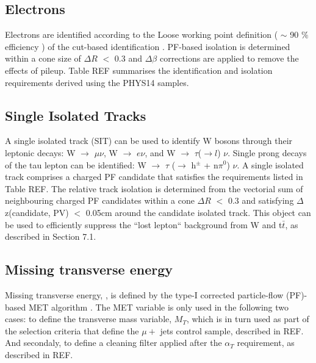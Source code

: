 \subsection{Electrons}
\label{sec:electron-id}
Electrons are identified according to the Loose working point definition ( $\sim$ 90 $\%$ efficiency ) of the cut-based identification \cite{electron-id}. PF-based isolation \cite{pf-photon} is determined within a cone size of $\Delta R$ $<$ 0.3 and $\Delta \beta$ corrections are applied to remove the effects of pileup. Table REF summarises the identification and isolation requirements derived using the PHYS14 samples. 	



\subsection{Single Isolated Tracks}
\label{sec:SIT}
A single isolated track (SIT) can be used to identify W bosons through their leptonic decays: W $\rightarrow$ $\mu \nu$, W $\rightarrow$ $e\nu$, and W $\rightarrow$ $\tau$($\rightarrow l$) $\nu$. Single prong decays of the tau lepton can be identified: W $\rightarrow$ $\tau$ ($\rightarrow$ h$^{\pm}$ + n$\pi^{0}$) $\nu$. A single isolated track comprises a charged PF candidate that satisfies the requirements listed in Table REF. The relative track isolation is determined from the vectorial sum of neighbouring charged PF candidates within a cone $\Delta R$ $<$ 0.3 and satisfying $\Delta$z(candidate, PV) $<$ 0.05cm around the candidate isolated track.
This object can be used to efficiently suppress the ``lost lepton`` background from W and t$\bar{t}$, as described in Section 7.1. 

\subsection{Missing transverse energy}
\label{sec:MET}
Missing transverse energy,  , is defined by the type-I corrected particle-flow (PF)-based MET algorithm \cite{met-corrections}. The MET variable is only used in the following two cases: to define the transverse mass variable, $M_{T}$, which is in turn used as part of the selection criteria that define the $\mu +$ jets control sample, described in REF. And secondaly, to define a cleaning filter applied after the $\alpha_{T}$ requirement, as described in REF. 


